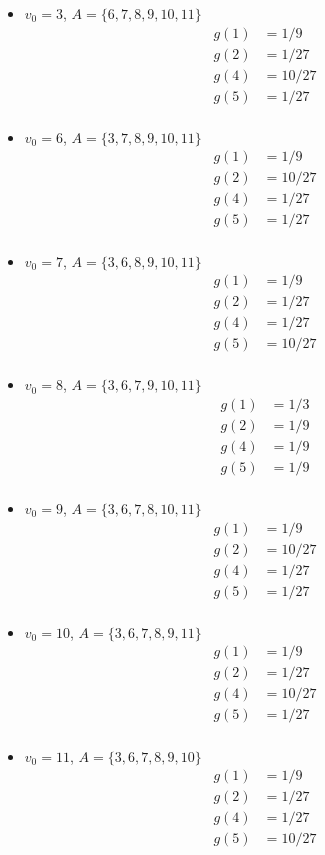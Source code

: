 \documentclass[letterpaper,11pt]{article}
\begin{document}
\begin{itemize}
	\item $v_0=3$, $A=\{6,7,8,9,10,11\}$
	\begin{align*}
	g(1)&=1/9\\
	g(2)&=1/27\\
	g(4)&=10/27\\
		g(5)&=1/27\\
		\end{align*}
		\item $v_0=6$, $A=\{3,7,8,9,10,11\}$
		\begin{align*}
		g(1)&=1/9\\
		g(2)&=10/27\\
		g(4)&=1/27\\
		g(5)&=1/27\\
	\end{align*}
	\item $v_0=7$, $A=\{3,6,8,9,10,11\}$
	\begin{align*}
	g(1)&=1/9\\
	g(2)&=1/27\\
	g(4)&=1/27\\
	g(5)&=10/27\\
	\end{align*}
	\item $v_0=8$, $A=\{3,6,7,9,10,11\}$
\begin{align*}
g(1)&=1/3\\
g(2)&=1/9\\
g(4)&=1/9\\
g(5)&=1/9\\
\end{align*}
\item $v_0=9$, $A=\{3,6,7,8,10,11\}$
\begin{align*}
g(1)&=1/9\\
g(2)&=10/27\\
g(4)&=1/27\\
g(5)&=1/27\\
\end{align*}
\item $v_0=10$, $A=\{3,6,7,8,9,11\}$
\begin{align*}
g(1)&=1/9\\
g(2)&=1/27\\
g(4)&=10/27\\
g(5)&=1/27\\
\end{align*}
\item $v_0=11$, $A=\{3,6,7,8,9,10\}$
\begin{align*}
g(1)&=1/9\\
g(2)&=1/27\\
g(4)&=1/27\\
g(5)&=10/27\\
\end{align*}
\end{itemize}
\end{document}
